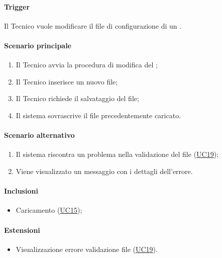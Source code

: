 \paragraph*{Trigger}
Il Tecnico vuole modificare il file di configurazione di un .

\paragraph*{Scenario principale}
\begin{enumerate}
  \item Il Tecnico avvia la procedura di modifica del ;
  \item Il Tecnico inserisce un nuovo file;
  \item Il Tecnico richiede il salvataggio del file;
  \item Il sistema sovrascrive il file precedentemente caricato.
\end{enumerate}

\paragraph*{Scenario alternativo}
\begin{enumerate}
  \item Il sistema riscontra un problema nella validazione del file (\hyperref[UC19]{UC19});
  \item Viene visualizzato un messaggio con i dettagli dell'errore.
\end{enumerate}

\paragraph*{Inclusioni}
\begin{itemize}
  \item Caricamento  (\hyperref[UC15]{UC15});
\end{itemize}

\paragraph*{Estensioni}
\begin{itemize}
  \item Visualizzazione errore validazione file (\hyperref[UC19]{UC19}).
\end{itemize}